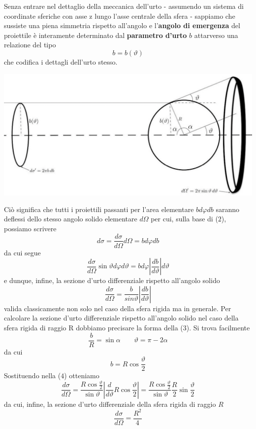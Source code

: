 Senza entrare nel dettaglio della meccanica dell'urto - assumendo un sistema di coordinate sferiche con asse z lungo l'asse centrale della sfera - sappiamo che sussiste una piena simmetria rispetto all'angolo e l'\textbf{angolo di emergenza} del proiettile è interamente determinato dal \textbf{parametro d'urto} $b$ attarverso una relazione del tipo
\begin{equation}
	b = b(\vartheta)
\end{equation} che codifica i dettagli dell'urto stesso.
\begin{marginfigure}
	\includegraphics[width = 1.3 \textwidth,scale = 1]{figs/ex-cross-section}
	\label{fig:ex-cross-section}
\end{marginfigure}
Ciò significa che tutti i proiettili passanti per l'area elementare $bd \varphi db$ saranno deflessi dello stesso angolo solido elementare $d \Omega$ per cui, sulla base di ($2$), possiamo scrivere \[
	d \sigma = \frac{d \sigma}{d \Omega}d \Omega = b d \varphi db
\] da cui segue \[
	\frac{d \sigma }{d \Omega} \sin \vartheta d \varphi d \vartheta   =  b d \varphi \left |\frac{db}{d \vartheta}\right | d \vartheta
\] e dunque, infine, la sezione d'urto differenziale rispetto all'angolo solido \begin{equation}
	\frac{d \sigma}{d \Omega} = \frac{b}{sin \vartheta}\left |\frac{db}{d \vartheta}\right |
\end{equation} valida classicamente non solo nel caso della sfera rigida ma in generale.
Per calcolare la sezione d'urto differenziale rispetto all'angolo solido nel caso della sfera rigida di raggio R dobbiamo precisare la forma della ($3$).
Si trova facilmente \[
	\frac{b}{R} = \sin{\alpha}  \qquad \vartheta = \pi - 2 \alpha
\] da cui \[
	b = R \cos{\frac{\vartheta}{2}}
\] Sostituendo nella ($4$) otteniamo \[
	\frac{d \sigma}{d \Omega} = \frac{R \cos{\frac{\vartheta}{2}}}{\sin \vartheta} \left | \frac{d}{d \vartheta}R \cos{\frac{\vartheta}{2}} \right | = \frac{R \cos{\frac{\vartheta}{2}}}{\sin \vartheta}\frac{R}{2} \sin \frac{\vartheta}{2}
\] da cui, infine, la sezione d'urto differenziale della sfera rigida di raggio $R$ \begin{equation}
	\frac{d \sigma}{d \Omega} = \frac{R^2}{4}
\end{equation}

